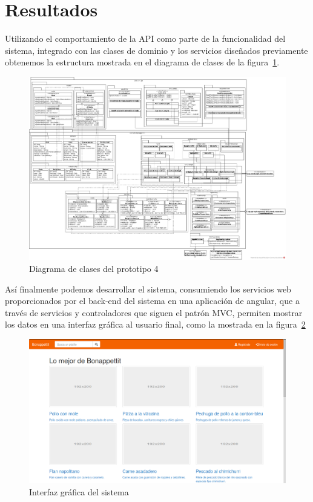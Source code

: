   \section{Resultados}
    Utilizando el comportamiento de la API como parte de la funcionalidad del sistema, integrado con las clases de dominio y los servicios diseñados previamente obtenemos la estructura mostrada en el diagrama de clases de la figura~\ref{fig:monster_classes}. 

    \begin{landscape}
      \begin{figure}[h!]
        \centering
        \includegraphics[width=25cm]{./images/monster_class}
        \caption{Diagrama de clases del prototipo 4}
        \label{fig:monster_classes}
      \end{figure}
    \end{landscape}

    Así finalmente podemos desarrollar el sistema, consumiendo los servicios web proporcionados por el back-end del sistema en una aplicación de angular, que a través de servicios y controladores que siguen el patrón MVC, permiten mostrar los datos en una interfaz gráfica al usuario final, como la mostrada en la figura~\ref{fig:final_bonappettit}


      \begin{figure}[h!]
        \centering
        \includegraphics[width=16cm]{./images/p4_bonappettit}
        \caption{Interfaz gráfica del sistema}
        \label{fig:final_bonappettit}
      \end{figure}

